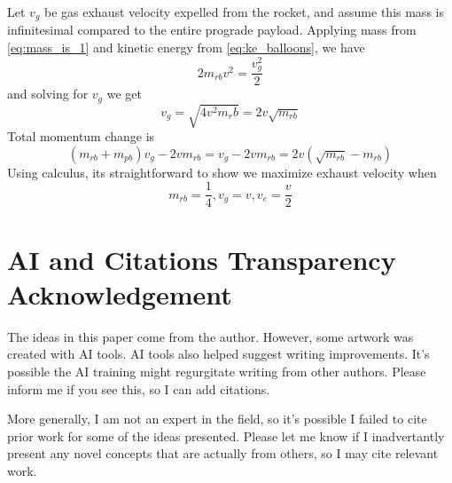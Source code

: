 \documentclass{article}
\begin{document}
Let $v_g$ be gas exhaust velocity expelled from the rocket, and assume this mass is infinitesimal compared to the entire prograde payload.  Applying mass from \autoref{eq:mass_is_1}
 and kinetic energy from \autoref{eq:ke_balloons}, we have 
 \begin{equation}
 2m_{rb}v^2= \frac{v_g^2}{2}
 \end{equation}
 and solving for $v_g$ we get 
 \begin{equation}
 v_g = \sqrt{4v^2m_rb} = 2v\sqrt{m_{rb}} \label{eq:vg_result}
 \end{equation}
 Total momentum change is 
 \[(m_{rb} + m_{pb})v_g - 2vm_{rb} = v_g-2vm_{rb} = 2v(\sqrt{m_{rb}} - m_{rb}) \]
 Using calculus, its straightforward to show we maximize exhaust velocity when 
 \begin{equation}
 m_{rb} = \frac{1}{4}, \label{eq:max_m_rb}
 v_g = v,
 v_e= \frac{v}{2}
 \end{equation}

 \section{AI and Citations Transparency Acknowledgement}
 The ideas in this paper come from the author.  However, some artwork was created with AI tools.  AI tools also helped suggest writing improvements.  It's possible the AI training might regurgitate writing from other authors.   Please inform me if you see this, so I can add citations.  

 More generally, I am not an expert in the field, so it's possible I failed to cite prior work for some of the ideas presented.   Please let me know if I inadvertantly present any novel concepts that are actually from others, so I may cite relevant work.
 
  
  
\end{document}
